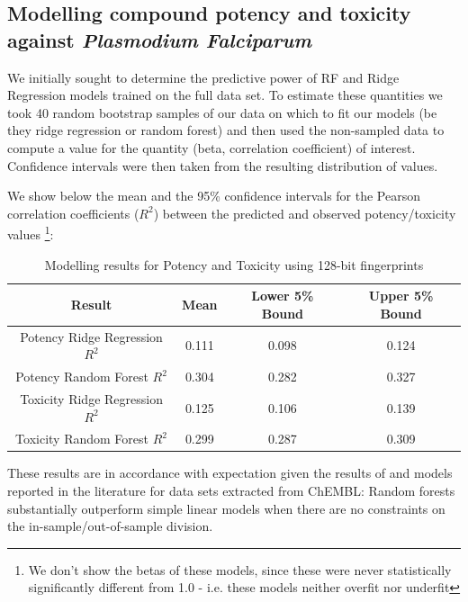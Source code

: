 \documentclass{article}
\begin{document}
\subsection{Modelling compound potency and toxicity against {\it Plasmodium Falciparum}
}

We initially sought to determine the predictive power of RF and Ridge Regression models trained on the full data set.  To estimate these quantities we took 40 random bootstrap samples of our data on which to fit our models (be they ridge regression or random forest) and then used the non-sampled data to compute a value for the quantity (beta, correlation coefficient) of interest.  Confidence intervals were then taken from the resulting distribution of values.

We show below the mean and the 95\% confidence intervals for the Pearson correlation coefficients ($R^2$) between the predicted and observed potency/toxicity values \footnote{We don't show the betas of these models, since these were never statistically significantly different from 1.0 - i.e. these models neither overfit nor underfit}: 

\begin{table}[h!]
\centering
 \begin{tabular}{||c c c c||} 
 \hline
 Result & Mean & Lower 5\% Bound & Upper 5\% Bound \\ [0.5ex] 
 \hline\hline
Potency Ridge Regression $R^2$ & 0.111 & 0.098 & 0.124 \\ 
 \hline
Potency Random Forest $R^2$ & 0.304 & 0.282 & 0.327 \\
 \hline
Toxicity Ridge Regression $R^2$ & 0.125 & 0.106 & 0.139 \\
 \hline
Toxicity Random Forest $R^2$ & 0.299 & 0.287 & 0.309\\
 \hline
\end{tabular}
\caption{Modelling results for Potency and Toxicity using 128-bit fingerprints}
\label{table:Potency}
\end{table}


These results are in accordance with expectation given the results of \citep{et1:} and models reported in the literature for data sets extracted from ChEMBL: Random forests substantially outperform simple linear models when there are no constraints on the in-sample/out-of-sample division.
\end{document}
